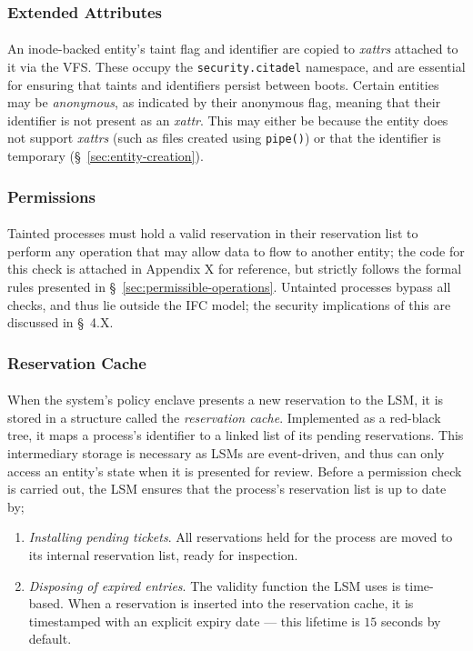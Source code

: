 \subsubsection{Extended Attributes} 
\paragraph{} An inode-backed entity's taint flag and identifier are copied to \textit{xattrs} attached to it via the VFS. These occupy the \texttt{security.citadel} namespace, and are essential for ensuring that taints and identifiers persist between boots. Certain entities may be \textit{anonymous}, as indicated by their anonymous flag, meaning that their identifier is not present as an \textit{xattr}. This may either be because the entity does not support \textit{xattrs} (such as files created using \texttt{pipe()}) or that the identifier is temporary (§~\ref{sec:entity-creation}).


\subsubsection{Permissions} 
\paragraph{} Tainted processes must hold a valid reservation in their reservation list to perform any operation that may allow data to flow to another entity; the code for this check is attached in Appendix X for reference, but strictly follows the formal rules presented in §~\ref{sec:permissible-operations}. Untainted processes bypass all checks, and thus lie outside the IFC model; the security implications of this are discussed in §~4.X.


\subsubsection{Reservation Cache} 
\paragraph{} When the system's policy enclave presents a new reservation to the LSM, it is stored in a structure called the \textit{reservation cache}. Implemented as a red-black tree, it maps a process's identifier to a linked list of its pending reservations. This intermediary storage is necessary as LSMs are event-driven, and thus can only access an entity's state when it is presented for review. Before a permission check is carried out, the LSM ensures that the process's reservation list is up to date by;
\begin{enumerate}
    \item \textit{Installing pending tickets}. All reservations held for the process are moved to its internal reservation list, ready for inspection.
    \item \textit{Disposing of expired entries}. The validity function the LSM uses is time-based. When a reservation is inserted into the reservation cache, it is timestamped with an explicit expiry date --- this lifetime is $15$ seconds by default.  
\end{enumerate}


